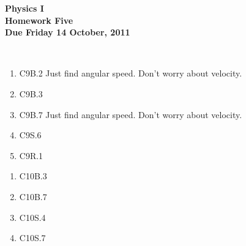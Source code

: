 \documentclass[12pt]{article}
\begin{document}
\pagestyle{empty}
 
\begin{center}
{\large {\bf Physics I}}\\
\medskip
{\large {\bf Homework Five}}\\
\medskip
{ {\bf Due Friday 14 October, 2011}}\\
\end{center}

\hspace{2mm}\\


\begin{enumerate}
\setlength{\itemsep}{-1mm}
  \item C9B.2  Just find angular speed.  Don't worry about velocity.
  \item C9B.3
  \item C9B.7  Just find angular speed.  Don't worry about velocity.
  \item C9S.6
  \item C9R.1
\end{enumerate}



\begin{enumerate}
\setlength{\itemsep}{-1mm}
  \item C10B.3
  \item C10B.7
  \item C10S.4
  \item C10S.7
\end{enumerate}
\end{document}
